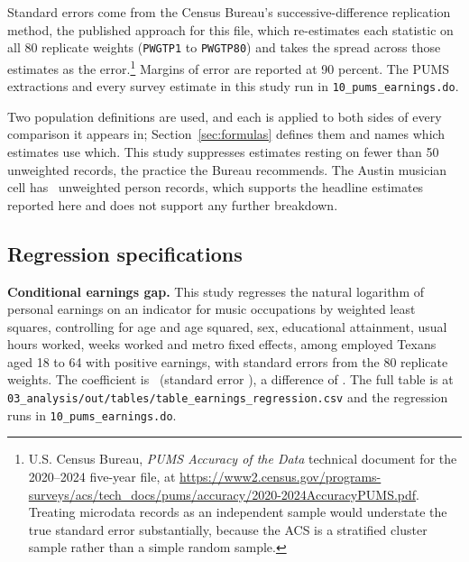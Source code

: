 Standard errors come from the Census Bureau's successive-difference
replication method, the published approach for this file, which re-estimates
each statistic on all 80 replicate weights (\texttt{PWGTP1} to
\texttt{PWGTP80}) and takes the spread across those estimates as the
error.\footnote{U.S. Census Bureau, \emph{PUMS Accuracy of the Data} technical
document for the 2020--2024 five-year file, at
\url{https://www2.census.gov/programs-surveys/acs/tech_docs/pums/accuracy/2020-2024AccuracyPUMS.pdf}.
Treating microdata records as an independent sample would understate the true
standard error substantially, because the ACS is a stratified cluster
sample rather than a simple random sample.} Margins of error are reported at
90 percent. The PUMS extractions and every survey estimate in this study run
in \texttt{10\_pums\_earnings.do}.

Two population definitions are used, and each is applied to both sides of
every comparison it appears in; Section~\ref{sec:formulas} defines them and
names which estimates use which. This study suppresses estimates resting on
fewer than 50 unweighted records, the practice the Bureau recommends. The
Austin musician cell has \NPumsAustinMusNPos\ unweighted person records,
which supports the headline estimates reported here and does not support any
further breakdown.

\subsection{Regression specifications}

\textbf{Conditional earnings gap.} This study regresses the natural logarithm
of personal earnings on an indicator for music occupations by weighted least
squares, controlling for age and age squared, sex, educational attainment,
usual hours worked, weeks worked and metro fixed effects, among employed
Texans aged 18 to 64 with positive earnings, with standard errors from the
80 replicate weights. The coefficient is \NPumsRegMusicCoef\ (standard error
\NPumsRegMusicSe), a difference of \NPumsRegMusicPctgap. The full table is
at \texttt{03\_analysis/out/tables/table\_earnings\_regression.csv} and the
regression runs in \texttt{10\_pums\_earnings.do}.

